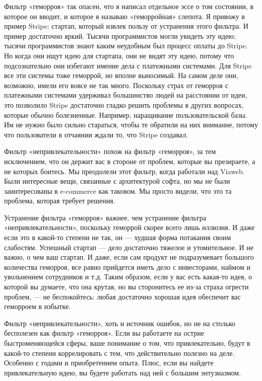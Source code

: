 \documentclass[ebook,12pt,oneside,openany]{memoir}
\begin{document}
Фильтр «геморроя» так опасен, что я написал отдельное эссе о том
состоянии, в которое он вводит, и которое я называю «геморройная»
слепота. Я привожу в пример Stripe: стартап, который извлек пользу от
устранения этого фильтра. И пример достаточно яркий. Тысячи
программистов могли увидеть эту идею; тысячи программистов знают каким
неудобным был процесс оплаты до Stripe. Но когда они ищут идею для
стартапа, они не видят эту идею, потому что подсознательно они
избегают имение дела с платежными системами. Для Stripe все эти
системы тоже геморрой, но вполне выносимый. На самом деле они,
возможно, имели его вовсе не так много. Поскольку страх от геморроя с
платежными системами удерживал большинство людей на расстоянии от
идеи, это позволило Stripe достаточно гладко решить проблемы в других
вопросах, которые обычно болезненные. Например, наращивание
пользовательской базы. Им не нужно было сильно стараться, чтобы те
обратили на них внимание, потому что пользователи в отчаянии ждали то,
что Stripe создавал.

Фильтр «непривлекательности» похож на фильтр «геморроя», за тем
исключением, что он держит вас в стороне от проблем, которые вы
презираете, а не которых боитесь. Мы преодолели этот фильтр, когда
работали над Viaweb. Были интересные вещи, связанные с архитектурой
софта, но мы не были заинтересованы в e-commerce как таковом. Мы
просто видели, что это та проблема, которая требует решения.

Устранение фильтра «геморроя» важнее, чем устранение фильтра
«непривлекательности», поскольку геморрой скорее всего лишь иллюзия. И
даже если это в какой-то степени не так, он — худшая форма потакания
своим слабостям. Успешный стартап — дело достаточно тяжелое и
утомительное. И не важно, о чем ваш стартап. И даже, если сам продукт
не подразумевает большого количества геморроя, все равно прийдется
иметь дело с инвесторами, наймом и увольнением сотрудников и т.д.
Таким образом, если у вас есть какая-то идея, о которой вы думаете,
что она крутая, но вы сторонитесь ее из-за страха огрести проблем, —
не беспокойтесь: любая достаточно хорошая идея обеспечит вас геморроем
в избытке.

Фильтр «непривлекательности», хоть и источник ошибок, но не на столько
бесполезен как фильтр «геморроя». Если вы работаете на острие
быстроменяющейся сферы, ваше понимание о том, что привлекательно,
будут в какой-то степени коррелировать с тем, что действительно
полезно на деле. Особенно с годами и приобретением опыта. Плюс, если
вы найдете привлекательную идею, вы будете работать над ней с большим
энтузиазмом.
\end{document}
